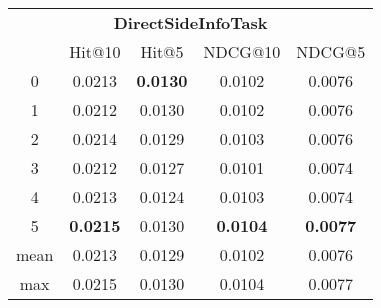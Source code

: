 \documentclass{article}
\begin{document}
 

\begin{tabular}{c|cccc}

\multicolumn{5}{c}{\textbf{DirectSideInfoTask}} \\
\noalign{\smallskip}
\noalign{\smallskip}
\toprule
\multicolumn{1}{c}{Template ID} & \multicolumn{1}{|c}{Hit@10} & \multicolumn{1}{c}{Hit@5} & \multicolumn{1}{c}{NDCG@10} & \multicolumn{1}{c}{NDCG@5} \\
\midrule
0 & 0.0213 & \textbf{0.0130} & 0.0102 & 0.0076 \\
1 & 0.0212 & 0.0130 & 0.0102 & 0.0076 \\
2 & 0.0214 & 0.0129 & 0.0103 & 0.0076 \\
3 & 0.0212 & 0.0127 & 0.0101 & 0.0074 \\
4 & 0.0213 & 0.0124 & 0.0103 & 0.0074 \\
5 & \textbf{0.0215} & 0.0130 & \textbf{0.0104} & \textbf{0.0077} \\
\midrule
mean & 0.0213 & 0.0129 & 0.0102 & 0.0076 \\
max & 0.0215 & 0.0130 & 0.0104 & 0.0077 \\
\bottomrule

\end{tabular}
\end{document}
